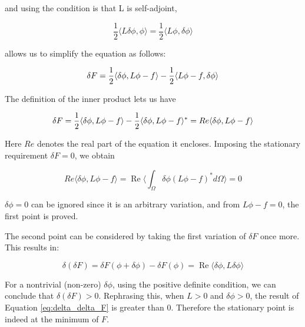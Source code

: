 \documentclass[a4paper,12pt]{report}
\renewcommand{\Re}{\operatorname{Re}}
\begin{document}
and using the condition is that L is self-adjoint,

\begin{equation}
  \frac{1}{2}\langle L\delta\phi,\phi \rangle = \frac{1}{2}\langle L\phi,\delta\phi \rangle
\end{equation}

allows us to simplify the equation as follows:

\begin{equation}
  \delta F = \frac{1}{2}\langle \delta\phi, L\phi - f \rangle \\
  - \frac{1}{2}\langle L\phi - f, \delta\phi \rangle
\end{equation}

The definition of the inner product lets us have

\begin{equation}
  \delta F = \frac{1}{2}\langle \delta\phi, L\phi - f \rangle \\
  - \frac{1}{2}\langle \delta\phi, L\phi - f \rangle^* \\
  = Re\langle \delta\phi, L\phi-f\rangle
\end{equation}

Here $Re$ denotes the real part of the equation it encloses. 
Imposing the stationary requirement $\delta F = 0$,
we obtain

\begin{equation}
  Re\langle \delta\phi, L\phi-f\rangle = \Re \langle \int_{\Omega} \delta\phi (L\phi - f)^{*} d\Omega \rangle = 0
\end{equation}

$\delta\phi = 0$ can be ignored since it is an arbitrary variation,
and from $L\phi - f = 0$, the first point is proved.

The second point can be considered by taking the first variation of $\delta F$
once more.
This results in:

\begin{equation} \label{eq:delta_delta_F}
  \delta(\delta F) = \delta F(\phi + \delta \phi) - \delta F(\phi) = \Re\langle \delta\phi, L\delta\phi \rangle
\end{equation}

For a nontrivial (non-zero) $\delta\phi$,
using the positive definite condition,
we can conclude that $\delta(\delta F) > 0$.
Rephrasing this, when $L > 0$ and $\delta \phi > 0$, 
the result of Equation \ref{eq:delta_delta_F} is greater than 0.
Therefore the stationary point is indeed at the minimum of $F$.
\end{document}
